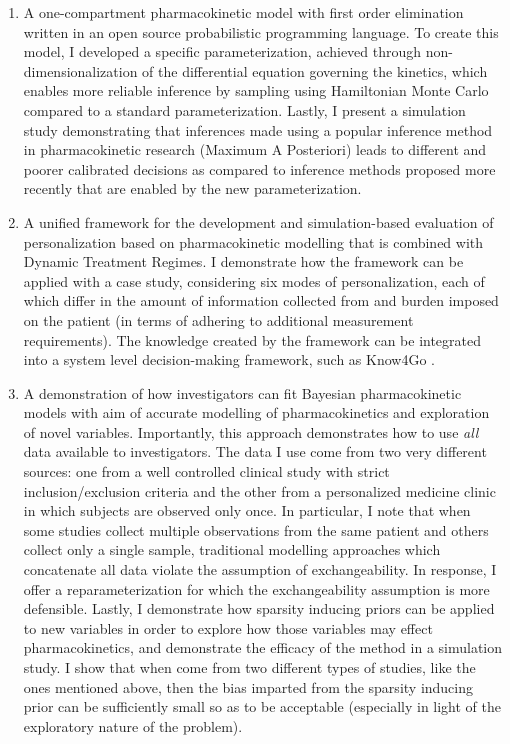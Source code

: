 \begin{enumerate}
	\item  A one-compartment pharmacokinetic model with first order elimination written in an open source probabilistic programming language.  To create this model, I developed a specific parameterization, achieved through non-dimensionalization of the differential equation governing the kinetics, which enables more reliable inference by sampling using Hamiltonian Monte Carlo compared to a standard parameterization.  Lastly, I present a simulation study demonstrating that inferences made using a popular inference method in pharmacokinetic research (Maximum A Posteriori) leads to different and poorer calibrated decisions as compared to inference methods proposed more recently that are enabled by the new parameterization.
	
	\item A unified framework for the development and simulation-based evaluation of personalization based on pharmacokinetic modelling that is combined with Dynamic Treatment Regimes. I demonstrate how the framework can be applied with a case study, considering six modes of personalization, each of which differ in the amount of information collected from  and burden imposed on the patient (in terms of adhering to additional measurement requirements).  The knowledge created by the framework can be integrated into a system level decision-making framework, such as Know4Go \cite{Martin2016}.  
	
	\item A demonstration of how investigators can fit Bayesian pharmacokinetic models with aim of accurate modelling of pharmacokinetics and exploration of novel variables.  Importantly, this approach demonstrates how to use \textit{all} data available to investigators.  The data I use come from two very different sources:  one from a well controlled clinical study with strict inclusion/exclusion criteria and the other from a personalized medicine clinic in which subjects are observed only once. In particular, I note that when some studies collect multiple observations from the same patient and others collect only a single sample, traditional modelling approaches which concatenate all data violate the assumption of exchangeability. In response, I offer a reparameterization for which the exchangeability assumption is more defensible.  Lastly, I demonstrate how sparsity inducing priors can be applied to new variables in order to explore how those variables may effect pharmacokinetics, and demonstrate the efficacy of the method in a simulation study.  I show that when come from two different types of studies, like the ones mentioned above, then the bias imparted from the sparsity inducing prior can be sufficiently small so as to be acceptable (especially in light of the exploratory nature of the problem). 
\end{enumerate}

